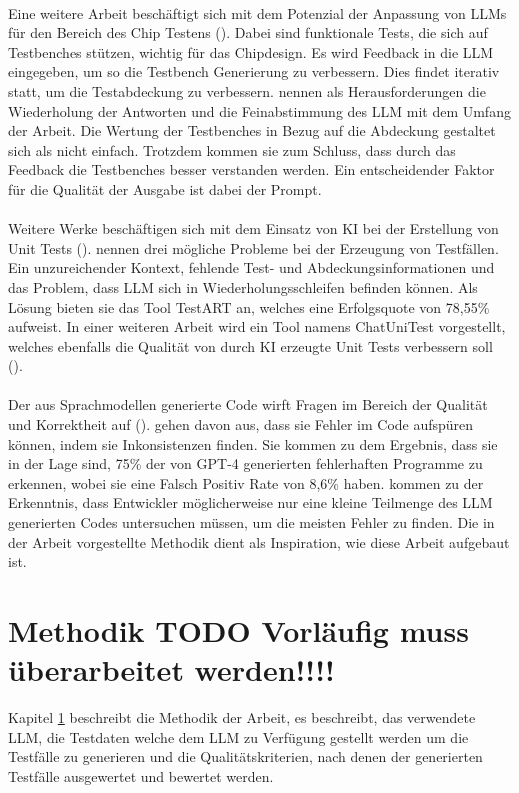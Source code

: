\documentclass[12pt,toc=bib,toc=listof]{scrreprt}
\begin{document}
\\
Eine weitere Arbeit beschäftigt sich mit dem Potenzial der Anpassung von LLMs für den Bereich des Chip Testens (\cite{Bhandari2024}). Dabei sind funktionale Tests, die sich auf Testbenches stützen, wichtig für das Chipdesign. Es wird Feedback in die LLM eingegeben, um so die Testbench Generierung zu verbessern. Dies findet iterativ statt, um die Testabdeckung zu verbessern. \textcite{Bhandari2024} nennen als Herausforderungen die Wiederholung der Antworten und die Feinabstimmung des LLM mit dem Umfang der Arbeit. Die Wertung der Testbenches in Bezug auf die Abdeckung gestaltet sich als nicht einfach. Trotzdem kommen sie zum Schluss, dass durch das Feedback die Testbenches besser verstanden werden. Ein entscheidender Faktor für die Qualität der Ausgabe ist dabei der Prompt.\\
\\
Weitere Werke beschäftigen sich mit dem Einsatz von KI bei der Erstellung von Unit Tests (\cite{Gu2024}). \textcite{Gu2024} nennen drei mögliche Probleme bei der Erzeugung von Testfällen. 
Ein unzureichender Kontext, fehlende Test- und Abdeckungsinformationen und das Problem, dass LLM sich in Wiederholungsschleifen befinden können. Als Lösung bieten sie das Tool TestART an, welches eine Erfolgsquote von 78,55\% aufweist. In einer weiteren Arbeit wird ein Tool namens ChatUniTest vorgestellt, welches ebenfalls die Qualität von durch KI erzeugte Unit Tests verbessern soll (\cite{Chen2024}).\\
\\
Der aus Sprachmodellen generierte Code wirft Fragen im Bereich der Qualität und Korrektheit auf (\cite{Wang2024}). \textcite{Wang2024}  gehen davon aus, dass sie Fehler im Code aufspüren können, indem sie Inkonsistenzen finden. Sie kommen zu dem Ergebnis, dass sie in der Lage sind, 75\% der von GPT-4 generierten fehlerhaften Programme zu erkennen, wobei sie eine Falsch Positiv Rate von 8,6\% haben. \textcite{Wang2024} kommen zu der Erkenntnis, dass Entwickler möglicherweise nur eine kleine Teilmenge des LLM generierten Codes untersuchen müssen, um die meisten Fehler zu finden. Die in der Arbeit vorgestellte Methodik dient als Inspiration, wie diese Arbeit aufgebaut ist.

\chapter{Methodik TODO Vorläufig muss überarbeitet werden!!!!} %
\label{sec:methodik}
Kapitel \ref{sec:methodik} beschreibt die Methodik der Arbeit, es beschreibt, das verwendete LLM, die Testdaten welche dem LLM zu Verfügung gestellt werden um die Testfälle zu generieren und die Qualitätskriterien, nach denen der generierten Testfälle ausgewertet und bewertet werden.
\end{document}
